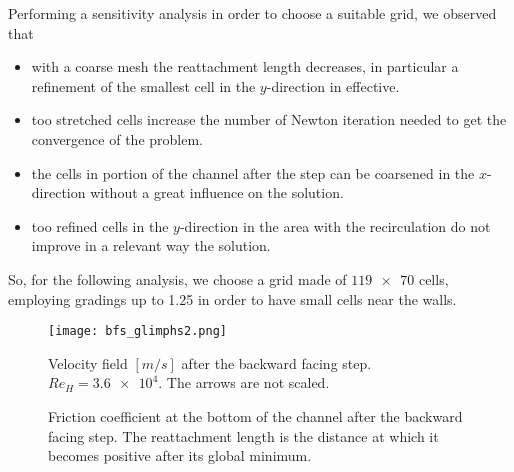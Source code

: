 Performing a sensitivity analysis in order to choose a suitable grid, we observed that
\begin{itemize}
	\item with a coarse mesh the reattachment length decreases, in particular a refinement of the smallest cell in the $y$-direction in effective.
	\item too stretched cells increase the number of Newton iteration needed to get the convergence of the problem.
	\item the cells in portion of the channel after the step can be coarsened in the $x$-direction without a great influence on the solution.
	\item too refined cells in the $y$-direction in the area with the recirculation do not improve in a relevant way the solution.
\end{itemize}
So, for the following analysis, we choose a grid made of $\num{119x70}$ cells, employing gradings up to 1.25 in order to have small cells near the walls.

\begin{figure}[p] %
	\centering
	\texttt{[image: bfs\_glimphs2.png]}
	\caption[Velocity field after the backward facing step]{Velocity field $[\si{m/s}]$ after the backward facing step. $Re_H=\num{3.6e4}$. The arrows are not scaled.}
	\label{fig:bfsarrows}
\end{figure}
\begin{figure}[p]
	\centering
	
	\caption[Friction coefficient in the backward facing step test]{Friction coefficient at the bottom of the channel after the backward facing step. The reattachment length is the distance at which it becomes positive after its global minimum.}
	\label{fig:bfscf}
\end{figure}

